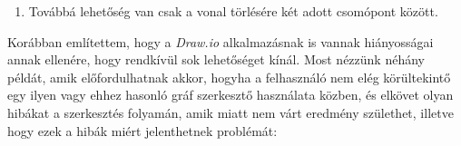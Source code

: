 \begin{enumerate}
\item Továbbá lehetőség van csak a vonal törlésére két adott csomópont között.

\end{enumerate}


Korábban említettem, hogy a \textit{Draw.io} alkalmazásnak is vannak hiányosságai annak ellenére, hogy rendkívül sok lehetőséget kínál. Most nézzünk néhány példát, amik előfordulhatnak akkor, hogyha a felhasználó nem elég körültekintő egy ilyen vagy ehhez hasonló gráf szerkesztő használata közben, és elkövet olyan hibákat a szerkesztés folyamán, amik miatt nem várt eredmény születhet, illetve hogy ezek a hibák miért jelenthetnek problémát:

